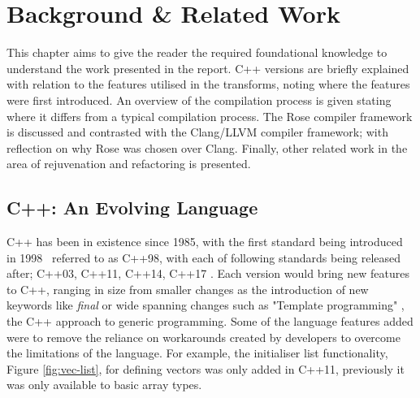 \documentclass[bsc,frontabs,singlespacing,twoside,parskip,deptreport]{infthesis}
\begin{document}

\chapter{Background \& Related Work}

This chapter aims to give the reader the required foundational knowledge to understand the work presented in the report. C++ versions are briefly explained with relation to the features utilised in the transforms, noting where the features were first introduced. An overview of the compilation process is given stating where it differs from a typical compilation process. The Rose compiler framework is discussed and contrasted with the Clang/LLVM compiler framework; with reflection on why Rose was chosen over Clang. Finally, other related work in the area of rejuvenation and refactoring is presented. 

\section{C++: An Evolving Language}\label{sec:cpp-background}
C++ has been in existence since 1985, with the first standard being introduced in 1998~\cite{ISO:1998:IIP} referred to as C++98, with each of following standards being released after; C++03, C++11, C++14, C++17 \cite{CPP_VER}. Each version would bring new features to C++, ranging in size from smaller changes as the introduction of new keywords like \textit{final} or wide spanning changes such as "Template programming" \cite{TEMP_CPP}, the C++ approach to generic programming. Some of the language features added were to remove the reliance on workarounds \cite{WORKARROUND_CPP} created by developers to overcome the limitations of the language. For example, the initialiser list functionality, Figure \ref{fig:vec-list}, for defining vectors was only added in C++11, previously it was only available to basic array types. 
\end{document}
